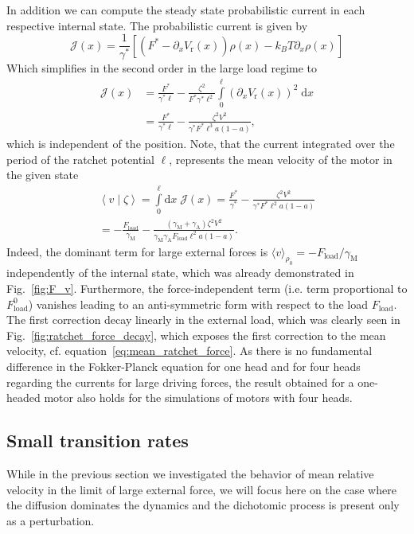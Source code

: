 \documentclass[aps,pre,twocolumn,showpacs,showkeys,superscriptaddress,floatfix]{revtex4-1}
\newcommand{\rmd}{{\mathrm d}}
\begin{document}
In addition we can compute the steady state probabilistic current in each respective internal state.
The probabilistic current is given by 
\[
\mathcal{J}(x) = \frac{1}{\gamma^*} \left[ \left( F^* - \partial_x V_\text{r}(x) \right) \rho(x) - k_B T \partial_x \rho(x) \right] 
\]
Which simplifies in the second order in the large load regime to
\begin{align*}
\mathcal{J}(x) 
&= \frac{F^*}{\gamma^* \ell} - \frac{\zeta^2}{F^* \gamma^* \ell^2} \int\limits^\ell_0 \left( \partial_x V_\text{r}(x) \right)^2 \; \rmd x \\
&= \frac{F^*}{\gamma^* \ell} - \frac{\zeta^2 V^2}{\gamma^* F^* \ell^3 a (1-a) } ,
\end{align*}
which is independent of the position. 
Note, that the current integrated over the period of the ratchet potential $\ell$, represents the mean velocity of the motor in the given state
\begin{multline}
\left\langle v \middle| \zeta \right\rangle 
= \int\limits_0^\ell \rmd x \; {\mathcal J}(x) 
= \frac{F^*}{\gamma^*} - \frac{\zeta^2 V^2}{\gamma^* F^* \ell^2 a (1-a) } 
\\
= - \frac{F_\text{load}}{\gamma_\text{M}} - \frac{ ( \gamma_\text{M} + \gamma_\text{A} ) \zeta^2 V^2}{\gamma_\text{M} \gamma_\text{A} F_\text{load} \ell^2 a (1-a) } .
\label{eq:mean_velocity_large}
\end{multline}
Indeed, the dominant term for large external forces is $\langle v \rangle_{\rho_0} = - F_\text{load} / \gamma_\text{M}$ independently of the internal state, 
which was already demonstrated in Fig.~\ref{fig:F_v}. 
Furthermore, the force-independent term (i.e. term proportional to $F_\text{load}^0$) vanishes leading to an anti-symmetric form with respect to the load $F_\text{load}$. 
The first correction decay linearly in the external load, which was clearly seen in Fig.~\ref{fig:ratchet_force_decay}, 
which exposes the first correction to the mean velocity, cf. equation~\eqref{eq:mean_ratchet_force}. 
As there is no fundamental difference in the Fokker-Planck equation for one head and for four heads regarding the currents for large driving forces, 
the result obtained for a one-headed motor also holds for the simulations of motors with four heads. 


\subsection{Small transition rates}
\label{ap:low_rates}
While in the previous section we investigated the behavior of mean relative velocity in the limit of large external force, 
we will focus here on the case where the diffusion dominates the dynamics and the dichotomic process is present only as a perturbation. 
\end{document}
